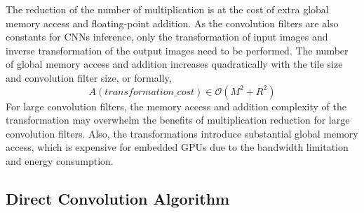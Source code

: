 \documentclass{article}
\begin{document}
The reduction of the number of multiplication is at the cost of extra global memory access and floating-point addition. As the convolution filters are also constants for CNNs inference, only the transformation of input images and inverse transformation of the output images need to be performed. The number of global memory access and addition increases quadratically with the tile size and convolution filter size, or formally, $$A(transformation\_cost) \in \mathcal{O}(M^{2} + R^{2})$$ For large convolution filters, the memory access and addition complexity of the transformation may overwhelm the benefits of multiplication reduction for large convolution filters. Also, the transformations introduce substantial global memory access, which is expensive for embedded GPUs due to the bandwidth limitation and energy consumption. 




\subsection{Direct Convolution Algorithm}
\end{document}
